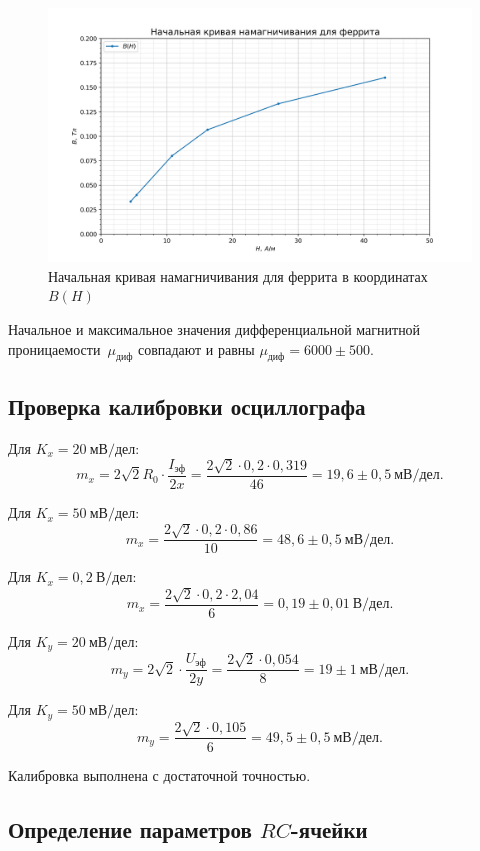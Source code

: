 \documentclass[a4paper, 12pt]{article}
\begin{document}
\begin{figure}[h!]
\begin{center}
    \includegraphics[scale=0.7]{3.4.5_3.png}
\end{center}
\caption{Начальная кривая намагничивания для феррита в координатах $B(H)$}
\label{fig:Ferrit:nach_petlya}
\end{figure}

Начальное и максимальное значения дифференциальной магнитной проницаемости~$\mu_{диф}$ совпадают и равны $\mu_{диф} = 6000\pm500$.

\newpage

\subsection{Проверка калибровки осциллографа}

Для $K_x = 20~мВ/дел$:
$$m_x = 2\sqrt{2}R_0 \cdot \frac{I_{эф}}{2x} = \frac{2\sqrt{2} \cdot 0,2 \cdot 0,319}{46} =  19,6\pm0,5~мВ/дел.$$

Для $K_x = 50~мВ/дел$:
$$m_x = \frac{2\sqrt{2} \cdot 0,2  \cdot 0,86}{10} = 48,6\pm0,5~мВ/дел.$$

Для $K_x = 0,2~В/дел$:
$$m_x = \frac{2\sqrt{2} \cdot 0,2  \cdot 2,04}{6} = 0,19\pm0,01~В/дел.$$

Для $K_y = 20~мВ/дел$:
$$m_y = 2\sqrt{2} \cdot \frac{U_{эф}}{2y} = \frac{2\sqrt{2} \cdot 0,054}{8} = 19\pm1~мВ/дел.$$

Для $K_y = 50~мВ/дел$:
$$m_y = \frac{2\sqrt{2} \cdot 0,105}{6} = 49,5\pm0,5~мВ/дел.$$

Калибровка выполнена с достаточной точностью.

\subsection{Определение параметров $RC$-ячейки}
\end{document}
